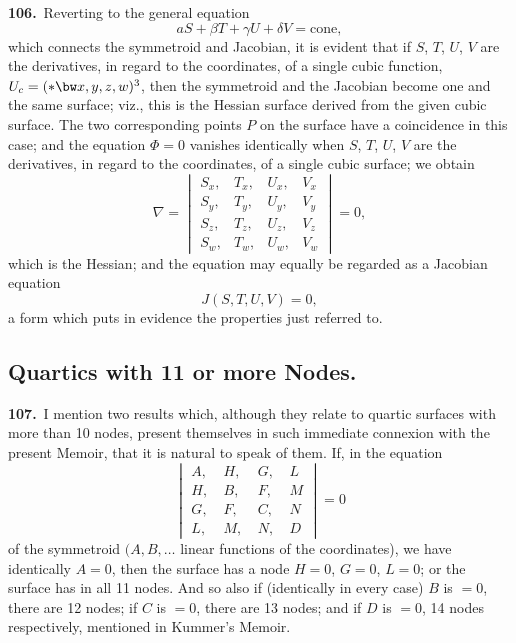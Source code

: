 \documentclass[11pt,a4paper]{article}
\begin{document}
\noindent\textbf{106.}\ Reverting to the general equation
\[
aS + \beta T + \gamma U + \delta V = \text{cone},
\]
which connects the symmetroid and Jacobian, it is evident that if $S$, $T$, $U$, $V$ are the derivatives, in regard to the coordinates, of a single cubic function, $U_c = (\ast\bw x, y, z, w)^3$, then the symmetroid and the Jacobian become one and the same surface; viz., this is the Hessian surface derived from the given cubic surface. The two corresponding points $P$ on the surface have a coincidence in this case; and the equation $\Phi = 0$ vanishes identically when $S$, $T$, $U$, $V$ are the derivatives, in regard to the coordinates, of a single cubic surface; we obtain
\[
\nabla = \begin{vmatrix}
S_x, & T_x, & U_x, & V_x\\
S_y, & T_y, & U_y, & V_y\\
S_z, & T_z, & U_z, & V_z\\
S_w, & T_w, & U_w, & V_w
\end{vmatrix} = 0,
\]
which is the Hessian; and the equation may equally be regarded as a Jacobian equation
\[
J(S, T, U, V) = 0,
\]
a form which puts in evidence the properties just referred to.

\newpage
\setcounter{page}{176}

\subsection*{Quartics with 11 or more Nodes.}

\noindent\textbf{107.}\ I mention two results which, although they relate to quartic surfaces with more than 10 nodes, present themselves in such immediate connexion with the present Memoir, that it is natural to speak of them. If, in the equation
\[
\begin{vmatrix}
A,\ & H,\ & G,\ & L\\
H,\ & B,\ & F,\ & M\\
G,\ & F,\ & C,\ & N\\
L,\ & M,\ & N,\ & D
\end{vmatrix} = 0
\]
of the symmetroid $(A, B, \ldots$ linear functions of the coordinates), we have identically $A = 0$, then the surface has a node $H = 0$, $G = 0$, $L = 0$; or the surface has in all 11 nodes. And so also if (identically in every case) $B$ is $= 0$, there are 12 nodes; if $C$ is $= 0$, there are 13 nodes; and if $D$ is $= 0$, 14 nodes respectively, mentioned in Kummer's Memoir.

\medskip
\end{document}
